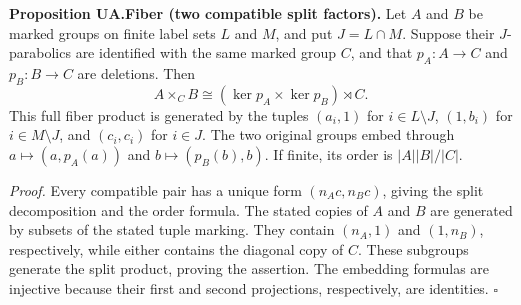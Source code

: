 \textbf{Proposition UA.Fiber (two compatible split factors).} Let \(A\)
and \(B\) be marked groups on finite label sets \(L\) and \(M\), and put
\(J=L\cap M\). Suppose their \(J\)-parabolics are identified with the
same marked group \(C\), and that \(p_A:A\to C\) and \(p_B:B\to C\) are
deletions. Then \[
A\times_C B\cong(\ker p_A\times\ker p_B)\rtimes C.
\tag{F1}
\] This full fiber product is generated by the tuples \((a_i,1)\) for
\(i\in L\setminus J\), \((1,b_i)\) for \(i\in M\setminus J\), and
\((c_i,c_i)\) for \(i\in J\). The two original groups embed through
\(a\mapsto(a,p_A(a))\) and \(b\mapsto(p_B(b),b)\). If finite, its order
is \(|A||B|/|C|\).

\emph{Proof.} Every compatible pair has a unique form \((n_Ac,n_Bc)\),
giving the split decomposition and the order formula. The stated copies
of \(A\) and \(B\) are generated by subsets of the stated tuple marking.
They contain \((n_A,1)\) and \((1,n_B)\), respectively, while either
contains the diagonal copy of \(C\). These subgroups generate the split
product, proving the assertion. The embedding formulas are injective
because their first and second projections, respectively, are
identities. \(\square\)
